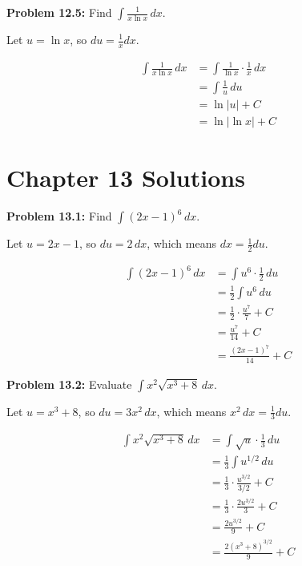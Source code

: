 \documentclass[12pt,a4paper]{book}
\theoremstyle{definition}
\begin{document}
\begin{solution}
\textbf{Problem 12.5:} Find $\int \frac{1}{x \ln x} \, dx$.

Let $u = \ln x$, so $du = \frac{1}{x} dx$.

\begin{align}
\int \frac{1}{x \ln x} \, dx &= \int \frac{1}{\ln x} \cdot \frac{1}{x} \, dx\\
&= \int \frac{1}{u} \, du\\
&= \ln|u| + C\\
&= \ln|\ln x| + C
\end{align}
\end{solution}

\section*{Chapter 13 Solutions}

\begin{solution}
\textbf{Problem 13.1:} Find $\int (2x - 1)^6 \, dx$.

Let $u = 2x - 1$, so $du = 2 \, dx$, which means $dx = \frac{1}{2} du$.

\begin{align}
\int (2x - 1)^6 \, dx &= \int u^6 \cdot \frac{1}{2} \, du\\
&= \frac{1}{2} \int u^6 \, du\\
&= \frac{1}{2} \cdot \frac{u^7}{7} + C\\
&= \frac{u^7}{14} + C\\
&= \frac{(2x - 1)^7}{14} + C
\end{align}
\end{solution}

\begin{solution}
\textbf{Problem 13.2:} Evaluate $\int x^2 \sqrt{x^3 + 8} \, dx$.

Let $u = x^3 + 8$, so $du = 3x^2 \, dx$, which means $x^2 \, dx = \frac{1}{3} du$.

\begin{align}
\int x^2 \sqrt{x^3 + 8} \, dx &= \int \sqrt{u} \cdot \frac{1}{3} \, du\\
&= \frac{1}{3} \int u^{1/2} \, du\\
&= \frac{1}{3} \cdot \frac{u^{3/2}}{3/2} + C\\
&= \frac{1}{3} \cdot \frac{2u^{3/2}}{3} + C\\
&= \frac{2u^{3/2}}{9} + C\\
&= \frac{2(x^3 + 8)^{3/2}}{9} + C
\end{align}
\end{solution}
\end{document}
